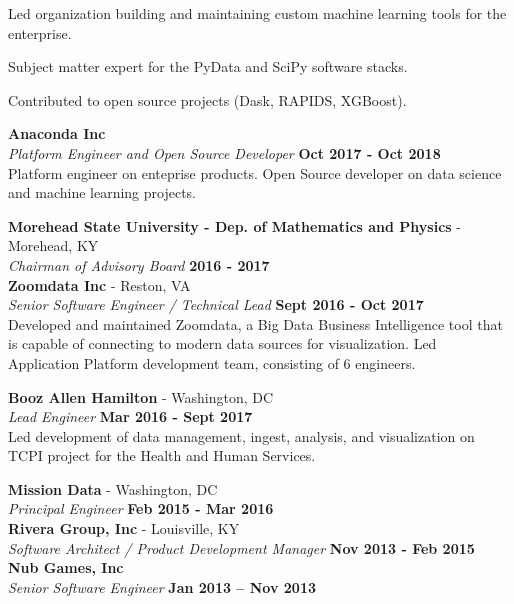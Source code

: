 \documentclass[margin,line]{res}
\begin{document}
\begin{resume}
Led organization building and maintaining custom machine learning tools for the enterprise.

Subject matter expert for the PyData and SciPy software stacks.

Contributed to open source projects (Dask, RAPIDS, XGBoost).

{\bf Anaconda Inc} \\
{\em Platform Engineer and Open Source Developer} \hfill {\bf Oct 2017 - Oct 2018}\\
Platform engineer on enteprise products.
Open Source developer on data science and machine learning projects.

{\bf Morehead State University - Dep. of Mathematics and Physics} - Morehead, KY\\
{\em Chairman of Advisory Board} \hfill {\bf 2016 - 2017}\\

{\bf Zoomdata Inc} - Reston, VA\\
{\em Senior Software Engineer / Technical Lead} \hfill {\bf Sept 2016 - Oct 2017}\\
Developed and maintained Zoomdata, a Big Data Business Intelligence tool that is capable of connecting to modern data sources for visualization.
Led Application Platform development team, consisting of 6 engineers.

{\bf Booz Allen Hamilton} - Washington, DC\\
{\em Lead Engineer} \hfill {\bf Mar 2016 - Sept 2017}\\
Led development of data management, ingest, analysis, and visualization on TCPI project for the Health and Human Services.

{\bf Mission Data} - Washington, DC\\
{\em Principal Engineer} \hfill {\bf Feb 2015 - Mar 2016}\\

{\bf Rivera Group, Inc} - Louisville, KY\\
{\em Software Architect / Product Development Manager} \hfill {\bf Nov 2013 - Feb 2015}\\

{\bf Nub Games, Inc}\\
{\em Senior Software Engineer} \hfill {\bf Jan 2013 – Nov 2013}\\


\end{resume}
\end{document}
